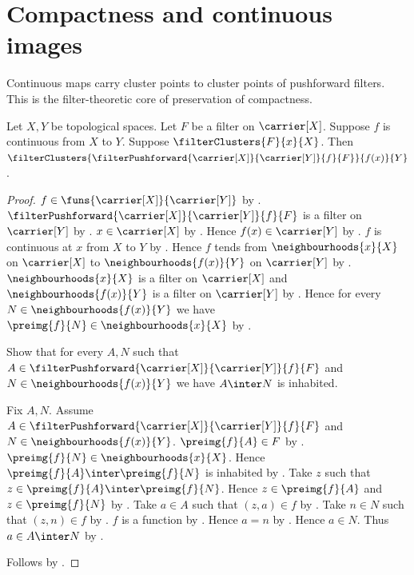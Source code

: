 \section{Compactness and continuous images}






Continuous maps carry cluster points to cluster points of pushforward
filters.  This is the filter-theoretic core of preservation of compactness.

\begin{theorem}\label{continuous_map_preserves_filter_cluster_points}
    Let $X,Y$ be topological spaces.
    Let $F$ be a filter on $\carrier[X]$.
    Suppose $f$ is continuous from $X$ to $Y$.
    Suppose $\filterClusters{F}{x}{X}$.
    Then
        $\filterClusters{
            \filterPushforward{\carrier[X]}{\carrier[Y]}{f}{F}
        }{f(x)}{Y}$.
\end{theorem}
\begin{proof}
    $f\in\funs{\carrier[X]}{\carrier[Y]}$ by
        .
    $\filterPushforward{\carrier[X]}{\carrier[Y]}{f}{F}$ is a filter on
        $\carrier[Y]$ by
        .
    $x\in\carrier[X]$ by .
    Hence $f(x)\in\carrier[Y]$ by .
    $f$ is continuous at $x$ from $X$ to $Y$ by
        .
    Hence $f$ tends from $\neighbourhoods{x}{X}$ on $\carrier[X]$ to
        $\neighbourhoods{f(x)}{Y}$ on $\carrier[Y]$ by
        .
    $\neighbourhoods{x}{X}$ is a filter on $\carrier[X]$ and
        $\neighbourhoods{f(x)}{Y}$ is a filter on $\carrier[Y]$ by
        .
    Hence for every $N\in\neighbourhoods{f(x)}{Y}$ we have
        $\preimg{f}{N}\in\neighbourhoods{x}{X}$ by
        .

    Show that for every $A,N$ such that
        $A\in\filterPushforward{\carrier[X]}{\carrier[Y]}{f}{F}$ and
        $N\in\neighbourhoods{f(x)}{Y}$ we have
        $A\inter N$ is inhabited.
    \begin{subproof}
        Fix $A,N$.
        Assume
            $A\in\filterPushforward{\carrier[X]}{\carrier[Y]}{f}{F}$ and
            $N\in\neighbourhoods{f(x)}{Y}$.
        $\preimg{f}{A}\in F$ by .
        $\preimg{f}{N}\in\neighbourhoods{x}{X}$.
        Hence $\preimg{f}{A}\inter\preimg{f}{N}$ is inhabited by
            .
        Take $z$ such that
            $z\in\preimg{f}{A}\inter\preimg{f}{N}$.
        Hence $z\in\preimg{f}{A}$ and $z\in\preimg{f}{N}$ by
            .
        Take $a\in A$ such that $(z,a)\in f$ by .
        Take $n\in N$ such that $(z,n)\in f$ by .
        $f$ is a function by .
        Hence $a=n$ by .
        Hence $a\in N$.
        Thus $a\in A\inter N$ by .
    \end{subproof}
    Follows by .
\end{proof}

